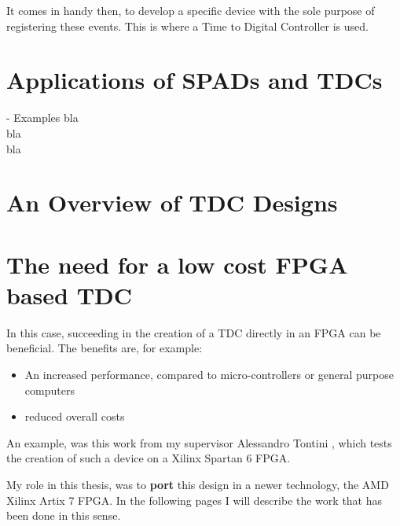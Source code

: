 It comes in handy then, to develop a specific device with the sole purpose of registering these events. This is where a Time to Digital Controller is used.

\section{Applications of SPADs and TDCs}
\label{sec:tdc-examples}
- Examples
bla \\ bla \\ bla

\section{An Overview of TDC Designs}

\section{The need for a low cost FPGA based TDC}
\label{sec:fpga-tdc}
In this case, succeeding in the creation of a TDC directly in an FPGA can be beneficial. The benefits are, for example:
\begin{itemize}
    \item An increased performance, compared to micro-controllers or general purpose computers
    \item reduced overall costs
\end{itemize}
An example, was this work from my supervisor Alessandro Tontini \cite{tdc-tontini}, which tests the creation of such a device on a Xilinx Spartan 6 FPGA.

My role in this thesis, was to \textbf{port} this design in a newer technology, the AMD Xilinx Artix 7 FPGA. In the following pages I will describe the work that has been done in this sense.



